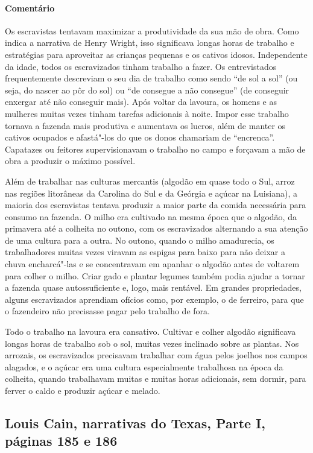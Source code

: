 \paragraph{Comentário}\quad
{\small
Os escravistas tentavam maximizar a produtividade da sua mão de
obra. Como indica a narrativa de Henry Wright, isso
significava longas horas de trabalho e estratégias para aproveitar as
crianças pequenas e os cativos idosos. Independente da idade, todos os
escravizados tinham trabalho a fazer. Os entrevistados frequentemente
descreviam o seu dia de trabalho como sendo ``de sol a sol'' (ou seja,
do nascer ao pôr do sol) ou ``de consegue a não consegue'' (de conseguir
enxergar até não conseguir mais). Após voltar da lavoura, os homens e as
mulheres muitas vezes tinham tarefas adicionais à noite. Impor esse
trabalho tornava a fazenda mais produtiva e aumentava os lucros, além de
manter os cativos ocupados e afastá"-los do que os donos chamariam de
``encrenca''. Capatazes ou feitores supervisionavam o trabalho no campo
e forçavam a mão de obra a produzir o máximo possível.

Além de trabalhar nas culturas mercantis (algodão em quase todo o
Sul, arroz nas regiões litorâneas da Carolina do Sul e da Geórgia e
açúcar na Luisiana), a maioria dos escravistas tentava produzir a maior
parte da comida necessária para consumo na fazenda. O milho era
cultivado na mesma época que o algodão, da primavera até a colheita no
outono, com os escravizados alternando a sua atenção de uma cultura para a
outra. No outono, quando o milho amadurecia, os trabalhadores muitas vezes
viravam as espigas para baixo para não deixar a chuva encharcá"-las e se
concentravam em apanhar o algodão antes de voltarem para colher o milho.
Criar gado e plantar legumes também podia ajudar a tornar a fazenda
quase autossuficiente e, logo, mais rentável. Em grandes propriedades,
alguns escravizados aprendiam ofícios como, por exemplo, o de ferreiro, para que o
fazendeiro não precisasse pagar pelo trabalho de fora.

Todo o trabalho na lavoura era cansativo. Cultivar e colher
algodão significava longas horas de trabalho sob o sol, muitas vezes
inclinado sobre as plantas. Nos arrozais, os escravizados precisavam
trabalhar com água pelos joelhos nos campos alagados, e o açúcar era uma
cultura especialmente trabalhosa na época da colheita, quando
trabalhavam muitas e muitas horas adicionais, sem dormir, para
ferver o caldo e produzir açúcar e melado.
}

\subsection{Louis Cain, narrativas do Texas, Parte I, páginas 185 e 186} \label{ref42}

